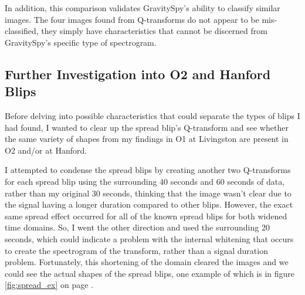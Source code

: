 \documentclass[a4paper]{article}
\begin{document}
In addition, this comparison validates GravitySpy's ability to classify similar images. The four images found from Q-transforms do not appear to be mis-classified, they simply have characteristics that cannot be discerned from GravitySpy's specific type of spectrogram.

\subsection{Further Investigation into O2 and Hanford Blips} \label{O2}

Before delving into possible characteristics that could separate the types of blips I had found, I wanted to clear up the spread blip's Q-transform and see whether the same variety of shapes from my findings in O1 at Livingston are present in O2 and/or at Hanford.

I attempted to condense the spread blips by creating another two Q-transforms for each spread blip using the surrounding 40 seconds and 60 seconds of data, rather than my original 30 seconds, thinking that the image wasn't clear due to the signal having a longer duration compared to other blips. However, the exact same spread effect occurred for all of the known spread blips for both widened time domains. So, I went the other direction and used the surrounding 20 seconds, which could indicate a problem with the internal whitening that occurs to create the spectrogram of the transform, rather than a signal duration problem. Fortunately, this shortening of the domain cleared the images and we could see the actual shapes of the spread blips, one example of which is in figure \ref{fig:spread_ex} on page \pageref{fig:spread_ex}.
\end{document}
